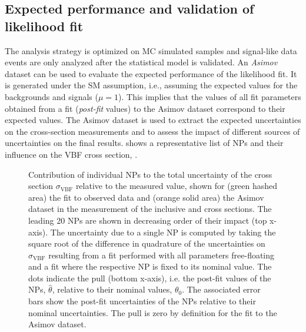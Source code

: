 \subsection{Expected performance and validation of likelihood fit}
\label{subsec:expected-performannce}
The analysis strategy is optimized on MC simulated samples and signal-like data events are only analyzed after the statistical model is validated.
An \emph{Asimov} dataset can be used to evaluate the expected performance of the likelihood fit. It is generated under the SM assumption, i.e., assuming the expected values for the backgrounds and signals ($\mu=1$). 
This implies that the values of all fit parameters obtained from a fit (\emph{post-fit} values) to the Asimov dataset correspond to their expected values. 
The Asimov dataset is used to extract the expected uncertainties on the cross-section measurements and to assess the impact of different sources of uncertainties on the final results. 
 shows a representative list of NPs and their influence on the VBF cross section, \sigmaVBF. 
\begin{figure}[th]
    \centering
    {\caption[Contribution of individual NPs to the total uncertainty of $\sigma_{\mathrm{VBF}}$ as well as NP pulls and constraints.]{Contribution of individual NPs to the total uncertainty of the cross section $\sigma_{\mathrm{VBF}}$ relative to the measured value, shown for (green hashed area) the fit to observed data and (orange solid area) the Asimov dataset in the measurement of the inclusive \muVBF and \muGGF cross sections. The leading 20 NPs are shown in decreasing order of their impact (top x-axis).
    The uncertainty due to a single NP is computed by taking the square root of the difference in quadrature of the uncertainties on $\sigma_{\mathrm{VBF}}$ resulting from a fit performed with all parameters free-floating and a fit where the respective NP is fixed to its nominal value. 
    The dots indicate the pull (bottom x-axis), i.e. the post-fit values of the NPs, $\hat{\theta}$, relative to their nominal values, $\theta_0$. 
    The associated error bars show the post-fit uncertainties of the NPs relative to their nominal uncertainties. 
    The pull is zero by definition for the fit to the Asimov dataset.
    \label{fig:fit:breakdown} }}
\end{figure}
